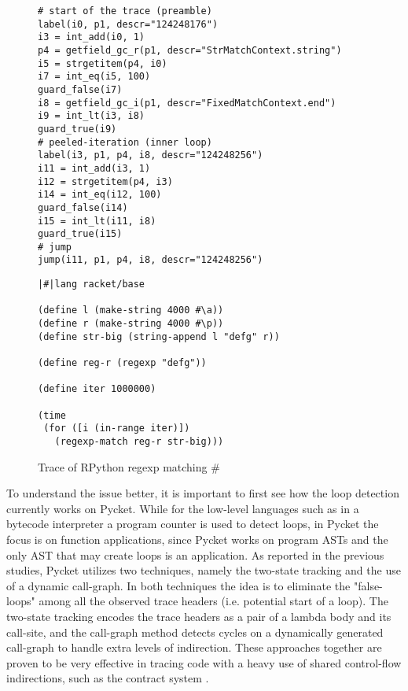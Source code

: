 \begin{wrapfigure}[26]{r}{0.40\textwidth}
    \vspace{-0.5cm}
    \centering
    \begin{minipage}[t]{0.38\textwidth}
      \begin{verbatim}
# start of the trace (preamble)
label(i0, p1, descr="124248176")
i3 = int_add(i0, 1)
p4 = getfield_gc_r(p1, descr="StrMatchContext.string")
i5 = strgetitem(p4, i0)
i7 = int_eq(i5, 100)
guard_false(i7)
i8 = getfield_gc_i(p1, descr="FixedMatchContext.end")
i9 = int_lt(i3, i8)
guard_true(i9)
# peeled-iteration (inner loop)
label(i3, p1, p4, i8, descr="124248256")
i11 = int_add(i3, 1)
i12 = strgetitem(p4, i3)
i14 = int_eq(i12, 100)
guard_false(i14)
i15 = int_lt(i11, i8)
guard_true(i15)
# jump
jump(i11, p1, p4, i8, descr="124248256")
    \end{verbatim}
    \end{minipage}
    \begin{minipage}[t]{0.38\textwidth}
      \begin{verbatim}
|#|lang racket/base

(define l (make-string 4000 #\a))
(define r (make-string 4000 #\p))
(define str-big (string-append l "defg" r))

(define reg-r (regexp "defg"))

(define iter 1000000)

(time
 (for ([i (in-range iter)])
   (regexp-match reg-r str-big)))
    \end{verbatim}
    \end{minipage}
    \caption{\small Trace of RPython regexp matching $\mathtt{\#}$}
    \label{fig:regexp-trace}
  \end{wrapfigure}

To understand the issue better, it is important to first see how the
loop detection currently works on Pycket. While for the low-level
languages such as in a bytecode interpreter a program counter is used
to detect loops, in Pycket the focus is on function applications,
since Pycket works on program ASTs and the only AST that may create
loops is an application. As reported in the previous studies, Pycket
utilizes two techniques, namely the two-state tracking and the use of
a dynamic call-graph. In both techniques the idea is to eliminate the
"false-loops" among all the observed trace headers (i.e. potential
start of a loop). The two-state tracking encodes the trace headers as
a pair of a lambda body and its call-site, and the call-graph method
detects cycles on a dynamically generated call-graph to handle extra
levels of indirection. These approaches together are proven to be very
effective in tracing code with a heavy use of shared control-flow
indirections, such as the contract system \cite{pycket15,pycket17}.

